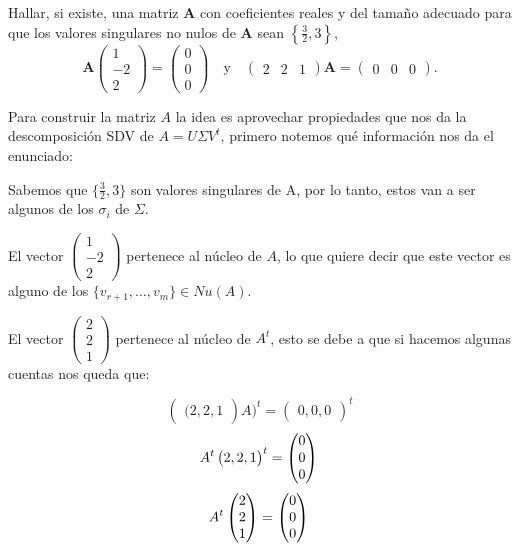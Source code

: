 \begin{enunciado}{\ejercicio}
Hallar, si existe, una matriz $\boldsymbol{A}$ con coeficientes reales y del tamaño adecuado para que los valores singulares no nulos de $\boldsymbol{A}$ sean $\left\{\frac{3}{2}, 3\right\}$,
$$
\boldsymbol{A} \begin{pmatrix} 1 \\ -2 \\ 2 \end{pmatrix} = \begin{pmatrix} 0 \\ 0 \\ 0 \end{pmatrix} \quad \text{y} \quad \begin{pmatrix} 2 & 2 & 1 \end{pmatrix} \boldsymbol{A} = \begin{pmatrix} 0 & 0 & 0 \end{pmatrix}.
$$
\end{enunciado}

Para construir la matriz $A$ la idea es aprovechar propiedades que nos da la descomposición SDV de $A = U \Sigma V^t$, primero notemos qué información nos da el enunciado:

Sabemos que $\{\frac{3}{2}, 3\}$ son valores singulares de A, por lo tanto, estos van a ser algunos de los $\sigma_i$ de $\Sigma$.

El vector $\begin{pmatrix} 1 \\ -2 \\ 2 \end{pmatrix}$ pertenece al núcleo de $A$, lo que quiere decir que este vector es alguno de los $\{v_{r+1}, \dots, v_m\} \in Nu(A)$.

El vector $\begin{pmatrix} 2 \\ 2 \\ 1 \end{pmatrix}$ pertenece al núcleo de $A^t$, esto se debe a que si hacemos algunas cuentas nos queda que:

$$
\begin{pmatrix} (2 , 2, 1 \end{pmatrix} A)^t = \begin{pmatrix} 0,0,0 \end{pmatrix} ^t
$$
$$
A^t \begin{pmatrix} 2 , 2, 1 \end{pmatrix}^t = \begin{pmatrix} 0 \\ 0 \\ 0 \end{pmatrix} \\
$$
$$
A^t \begin{pmatrix} 2 \\ 2 \\ 1 \end{pmatrix} = \begin{pmatrix} 0 \\ 0 \\ 0 \end{pmatrix} \\
$$


